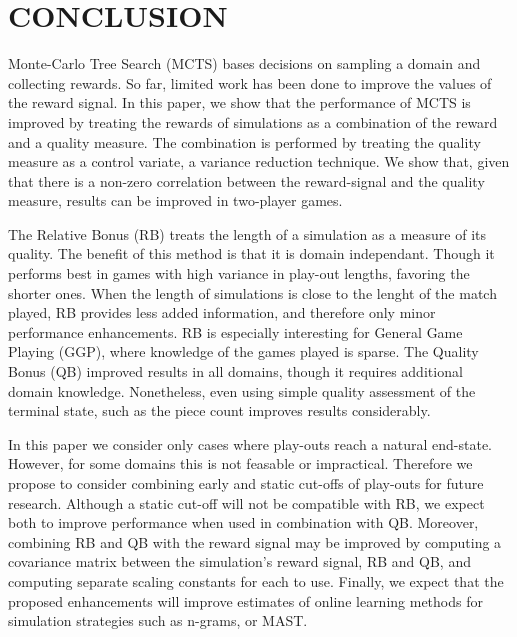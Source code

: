 \documentclass{ecai2014}
\begin{document}
\section{CONCLUSION}
\label{sec:concl}
Monte-Carlo Tree Search (MCTS) bases decisions on sampling a domain and collecting rewards. So far, limited work has been done to improve the values of the reward signal. In this paper, we show that the performance of MCTS is improved by treating the rewards of simulations as a combination of the reward and a quality measure. The combination is performed by treating the quality measure as a control variate, a variance reduction technique. We show that, given that there is a non-zero correlation between the reward-signal and the quality measure, results can be improved in two-player games.

The Relative Bonus (RB) treats the length of a simulation as a measure of its quality. The benefit of this method is that it is domain independant. Though it performs best in games with high variance in play-out lengths, favoring the shorter ones. When the length of simulations is close to the lenght of the match played, RB provides less added information, and therefore only minor performance enhancements. RB is especially interesting for General Game Playing (GGP), where knowledge of the games played is sparse.
The Quality Bonus (QB) improved results in all domains, though it requires additional domain knowledge. Nonetheless, even using simple quality assessment of the terminal state, such as the piece count improves results considerably.

In this paper we consider only cases where play-outs reach a natural end-state. However, for some domains this is not feasable or impractical. Therefore we propose to consider combining early and static cut-offs of play-outs for future research. Although a static cut-off will not be compatible with RB, we expect both to improve performance when used in combination with QB. Moreover, combining RB and QB with the reward signal may be improved by computing a covariance matrix between the simulation's reward signal, RB and QB, and computing separate scaling constants for each to use. Finally, we expect that the proposed enhancements will improve estimates of online learning methods for simulation strategies such as n-grams, or MAST.



\end{document}
